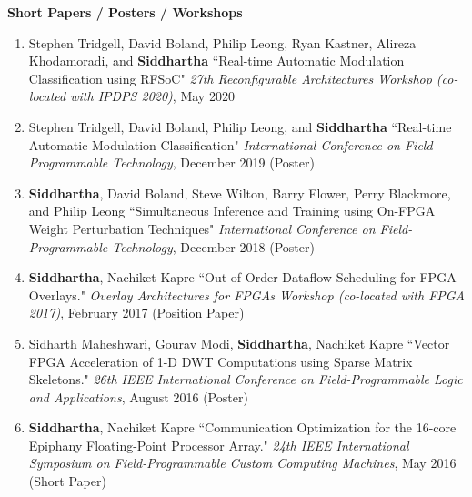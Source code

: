 \documentclass[10pt]{article}
\begin{document}
{\begin{adjustwidth}{-1.25in}{}
        \vspace{0.1in}
        \textbf{\large Short Papers / Posters / Workshops}
        \begin{enumerate}
            \item Stephen Tridgell, David Boland, Philip Leong, Ryan Kastner, Alireza Khodamoradi, and {\bf Siddhartha} ``Real-time Automatic Modulation Classification using RFSoC" \emph{27th Reconfigurable Architectures Workshop (co-located with IPDPS 2020)}, May 2020
            \item Stephen Tridgell, David Boland, Philip Leong, and {\bf Siddhartha} ``Real-time Automatic Modulation Classification" \emph{International Conference on Field-Programmable Technology}, December 2019 (Poster)
            \item {\bf Siddhartha}, David Boland, Steve Wilton, Barry Flower, Perry Blackmore, and Philip Leong ``Simultaneous Inference and Training using On-FPGA Weight Perturbation Techniques" \emph{International Conference on Field-Programmable Technology}, December 2018 (Poster)
            \item {\bf Siddhartha}, Nachiket Kapre ``Out-of-Order Dataflow Scheduling for FPGA Overlays." \emph{Overlay Architectures for FPGAs Workshop (co-located with FPGA 2017)}, February 2017 (Position Paper)
            \item Sidharth Maheshwari, Gourav Modi, {\bf Siddhartha}, Nachiket Kapre ``Vector FPGA Acceleration of 1-D DWT Computations using Sparse Matrix Skeletons." \emph{26th IEEE International Conference on Field-Programmable Logic and Applications}, August 2016 (Poster)
            \item {\bf Siddhartha}, Nachiket Kapre ``Communication Optimization for the 16-core Epiphany Floating-Point Processor Array." \emph{24th IEEE International Symposium on Field-Programmable Custom Computing Machines}, May 2016 (Short Paper)

\end{enumerate}
\end{adjustwidth}}
\end{document}
